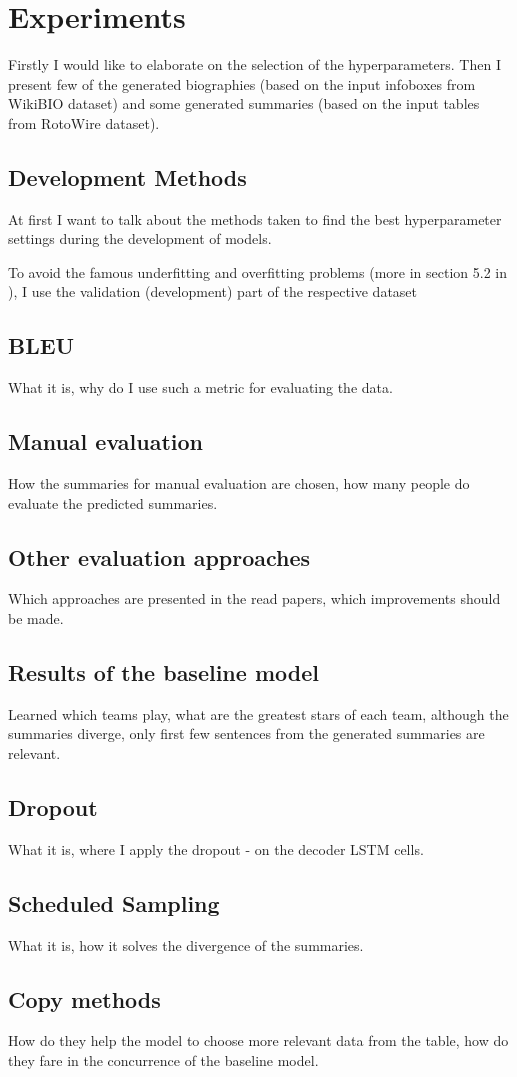 \chapter{Experiments} \label{experiments_chapter}
Firstly I would like to elaborate on the selection of the hyperparameters. Then I present few of the generated biographies (based on the input infoboxes from WikiBIO dataset) and some generated summaries (based on the input tables from RotoWire dataset).

\section{Development Methods}

At first I want to talk about the methods taken to find the best hyperparameter settings during the development of models.

To avoid the famous underfitting and overfitting problems (more in section 5.2 in \citep{Goodfellow-et-al-2016}), I use the validation (development) part of the respective dataset 
\section{BLEU}
What it is, why do I use such a metric for evaluating the data.

\section{Manual evaluation}
How the summaries for manual evaluation are chosen, how many people do evaluate the predicted summaries.

\section{Other evaluation approaches}
Which approaches are presented in the read papers, which improvements should be made.

\section{Results of the baseline model}
Learned which teams play, what are the greatest stars of each team, although the summaries diverge, only first few sentences from the generated summaries are relevant.

\section{Dropout}
What it is, where I apply the dropout - on the decoder LSTM cells.

\section{Scheduled Sampling}
What it is, how it solves the divergence of the summaries.

\section{Copy methods}
How do they help the model to choose more relevant data from the table, how do they fare in the concurrence of the baseline model.